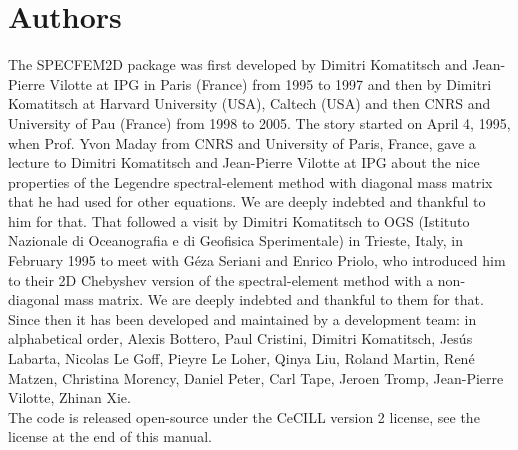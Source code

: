 \documentclass[oneside,english,onecolumn,letterpaper]{book}
\begin{document}
\section*{Authors}
The SPECFEM2D package was first developed by Dimitri Komatitsch and Jean-Pierre Vilotte at IPG in Paris (France) from 1995 to 1997
and then by Dimitri Komatitsch at Harvard University (USA), Caltech (USA) and then CNRS and University of Pau (France) from 1998 to 2005.
The story started on April 4, 1995, when Prof. Yvon Maday from CNRS and University of Paris, France, gave a lecture to
Dimitri Komatitsch and Jean-Pierre Vilotte at IPG about the nice properties of the Legendre spectral-element method with diagonal mass matrix that he had used for
other equations. We are deeply indebted and thankful to him for that.
That followed a visit by Dimitri Komatitsch to OGS (Istituto Nazionale di Oceanografia e di Geofisica Sperimentale) in Trieste, Italy, in February 1995
to meet with G\'eza Seriani and Enrico Priolo, who introduced him to their 2D Chebyshev version of the spectral-element method with a non-diagonal mass matrix.
We are deeply indebted and thankful to them for that.\\

Since then it has been developed and maintained by a development team: in alphabetical order,
Alexis Bottero,
Paul Cristini,
Dimitri Komatitsch,
Jes\'us Labarta,
Nicolas Le Goff,
Pieyre Le Loher,
Qinya Liu,
Roland Martin,
Ren\'e Matzen,
Christina Morency,
Daniel Peter,
Carl Tape,
Jeroen Tromp,
Jean-Pierre Vilotte,
Zhinan Xie.\\

The code is released open-source under the CeCILL version 2 license, see the license at the end of this manual.\\

\newpage{}
\end{document}

